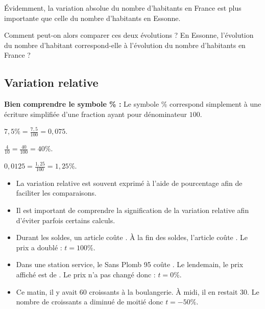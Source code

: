 \documentclass[10pt,openright,twoside,french]{book}
\begin{document}
\begin{Rmq}
    \'Evidemment, la variation absolue du nombre d'habitants en France est plus importante que celle du nombre d'habitants en Essonne.\par Comment peut-on alors comparer ces deux évolutions ? En Essonne, l'évolution du nombre d'habitant correspond-elle à l'évolution du nombre d'habitants en France ?
\end{Rmq}

\subsection{Variation relative}
\textbf{Bien comprendre le symbole \% :}
Le symbole \% correspond simplement à une écriture simplifiée d'une fraction ayant pour dénominateur $100$.\medskip

\begin{Exemple}[s]
    $7,5\% = \frac{7,5}{100} = 0,075$.\par\medskip
    $\frac{4}{10} = \frac{40}{100} = 40\%$.\par\medskip
    $0,0125 = \frac{1,25}{100} = 1,25\%$.
\end{Exemple}

\begin{Rmq}[s]
    \begin{itemize}
        \item La variation relative est souvent exprimé à l'aide de pourcentage afin de faciliter les comparaisons.
        \item Il est important de comprendre la signification de la variation relative afin d'éviter parfois certains calculs.
    \end{itemize}
\end{Rmq}\medskip

\begin{Exemple}[s]
    \begin{itemize}
        \item Durant les soldes, un article coûte . À la fin des soldes, l'article coûte . Le prix a doublé : $t = 100\%$.\par
        \item Dans une station service, le Sans Plomb 95 coûte . Le lendemain, le prix affiché est de . Le prix n'a pas changé donc : $t = 0\%$.
        \item Ce matin, il y avait $60$ croissants à la boulangerie. À midi, il en restait $30$. Le nombre de croissants a diminué de moitié donc $t = -50\%$.
    \end{itemize}
\end{Exemple}\medskip
\end{document}
